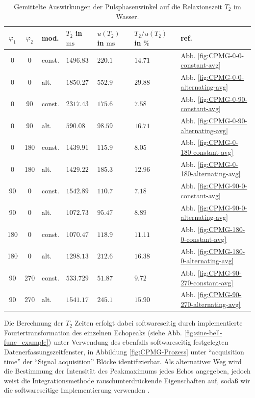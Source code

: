 \documentclass[../../main.tex]{subfiles}
\begin{document}
        \begin{table}[H]
            \centering
            \begin{tabular}{c|c|l|lll|l}
                $\varphi_1$ & $\varphi_2$ & mod. & $T_2$ in $\si{\ms}$ & $u(T_2)$ in $\si{\ms}$ & $T_2/u(T_2)$ in $\si{\percent}$ & ref. \\
                \hline\hline
                0 & 0 & const. & $1496.83$ & $220.1$ & $14.71$ & Abb. \ref{fig:CPMG-0-0-constant-avg} \\
                0 & 0 & alt. & $1850.27$ & $552.9$ & $29.88$ & Abb. \ref{fig:CPMG-0-0-alternating-avg} \\
                \hline
                0 & 90 & const. & $2317.43$ & $175.6$ & $7.58$ & Abb. \ref{fig:CPMG-0-90-constant-avg} \\
                0 & 90 & alt. & $590.08$ & $98.59$ & $16.71$ & Abb. \ref{fig:CPMG-0-90-alternating-avg} \\
                \hline
                0 & 180 & const. & $1439.91$ & $115.9$ & $8.05$ & Abb. \ref{fig:CPMG-0-180-constant-avg} \\
                0 & 180 & alt. & $1429.22$ & $185.3$ & $12.96$ & Abb. \ref{fig:CPMG-0-180-alternating-avg} \\
                \hline
                90 & 0 & const. & $1542.89$ & $110.7$ & $7.18$ & Abb. \ref{fig:CPMG-90-0-constant-avg} \\
                90 & 0 & alt. & $1072.73$ & $95.47$ & $8.89$ & Abb. \ref{fig:CPMG-90-0-alternating-avg} \\
                \hline
                180 & 0 & const. & $1070.47$ & $118.9$ & $11.11$ & Abb. \ref{fig:CPMG-180-0-constant-avg} \\
                180 & 0 & alt. & $1298.13$ & $212.6$ & $16.38$ & Abb. \ref{fig:CPMG-180-0-alternating-avg} \\
                \hline
                90 & 270 & const. & $533.729$ & $51.87$ & $9.72$ & Abb. \ref{fig:CPMG-90-270-constant-avg} \\
                90 & 270 & alt. & $1541.17$ & $245.1$ & $15.90$ & Abb. \ref{fig:CPMG-90-270-alternating-avg} \\
            \end{tabular}
            \caption{Gemittelte Auswirkungen der Pulsphasenwinkel auf die Relaxionszeit $T_2$ im Wasser.}
            \label{tab:CPMG-avg}
        \end{table}
        Die Berechnung der $T_2$ Zeiten erfolgt dabei softwareseitig durch implementierte Fouriertransformation des einzelnen Echopeaks (siehe Abb. \ref{fig:sine-bell-func_example}) unter Verwendung des ebenfalls softwareseitig festgelegten Datenerfassungszeitfenster, in Abbildung \ref{fig:CPMG-Prozess} unter \enquote{acquisition time} der \enquote{Signal acquisition} Blöcke identifizierbar. Als alternativer Weg wird die Bestimmung der Intensität des Peakmaximums jedes Echos angegeben, jedoch weist die Integrationsmethode rauschunterdrückende Eigenschaften auf, sodaß wir die softwareseitige Implementierung verwenden \cite[ch 5.3.1]{doc:EFNMRStudentManual}. 
\end{document}
